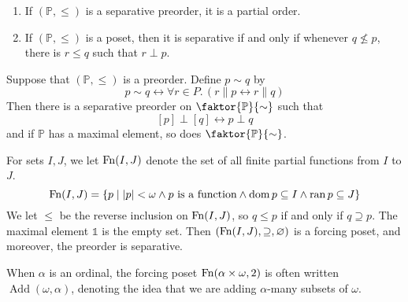 \begin{proposition}
    \begin{enumerate}
        \item If \( (\mathbb P, \leq) \) is a separative preorder, it is a partial order.
        \item If \( (\mathbb P, \leq) \) is a poset, then it is separative if and only if whenever \( q \nleq p \), there is \( r \leq q \) such that \( r \perp p \).
    \end{enumerate}
\end{proposition}
\begin{proposition}
    Suppose that \( (\mathbb P, \leq) \) is a preorder.
    Define \( p \sim q \) by
    \[ p \sim q \leftrightarrow \forall r \in P.\, (r \mathrel\| p \leftrightarrow r \mathrel\| q) \]
    Then there is a separative preorder on \( \faktor{\mathbb P}{\sim} \) such that
    \[ [p] \perp [q] \leftrightarrow p \perp q \]
    and if \( \mathbb P \) has a maximal element, so does \( \faktor{\mathbb P}{\sim} \).
\end{proposition}
\begin{example}
    For sets \( I, J \), we let \( \operatorname{Fn}(I, J) \) denote the set of all finite partial functions from \( I \) to \( J \).
    \[ \operatorname{Fn}(I, J) = \qty{p \mid \abs{p} < \omega \wedge p \text{ is a function} \wedge \operatorname{dom}p \subseteq I \wedge \operatorname{ran}p \subseteq J} \]
    We let \( \leq \) be the reverse inclusion on \( \operatorname{Fn}(I, J) \), so \( q \leq p \) if and only if \( q \supseteq p \).
    The maximal element \( \Bbbone \) is the empty set.
    Then \( (\operatorname{Fn}(I, J), \supseteq, \varnothing) \) is a forcing poset, and moreover, the preorder is separative.
\end{example}
\begin{remark}
    When \( \alpha \) is an ordinal, the forcing poset \( \operatorname{Fn}(\alpha \times \omega, 2) \) is often written \( \operatorname{Add}(\omega, \alpha) \), denoting the idea that we are adding \( \alpha \)-many subsets of \( \omega \).
\end{remark}

